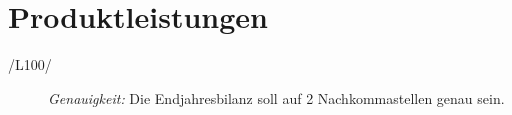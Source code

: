 
\section{Produktleistungen}

\begin{description}
  \item[/L100/]
    \textit{Genauigkeit:}
    	Die Endjahresbilanz soll auf 2 Nachkommastellen genau sein.
\end{description}

